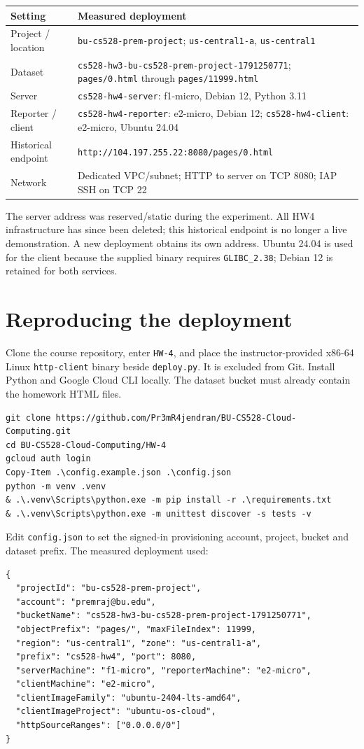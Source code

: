 \documentclass[11pt,letterpaper]{article}
\newcommand{\code}[1]{\texttt{\small #1}}
\newcommand{\bucket}{\nolinkurl{cs528-hw3-bu-cs528-prem-project-1791250771}}
\newcommand{\newreportpage}[1]{\clearpage\section{#1}}
\begin{document}
\begin{tabularx}{\linewidth}{@{}lY@{}}\toprule
Setting & Measured deployment \\ \midrule
Project / location & \code{bu-cs528-prem-project}; \code{us-central1-a}, \code{us-central1} \\
Dataset & \bucket; \code{pages/0.html} through \code{pages/11999.html} \\
Server & \code{cs528-hw4-server}: f1-micro, Debian 12, Python 3.11 \\
Reporter / client & \code{cs528-hw4-reporter}: e2-micro, Debian 12; \code{cs528-hw4-client}: e2-micro, Ubuntu 24.04 \\
Historical endpoint & \nolinkurl{http://104.197.255.22:8080/pages/0.html} \\
Network & Dedicated VPC/subnet; HTTP to server on TCP 8080; IAP SSH on TCP 22 \\
\bottomrule\end{tabularx}

The server address was reserved/static during the experiment. All HW4 infrastructure has
since been deleted; this historical endpoint is no longer a live demonstration. A new
deployment obtains its own address. Ubuntu 24.04 is used for the client because the supplied
binary requires \code{GLIBC\_2.38}; Debian 12 is retained for both services.

\newreportpage{Reproducing the deployment}
\label{sec:reproduce}
Clone the course repository, enter \code{HW-4}, and place the instructor-provided x86-64 Linux
\code{http-client} binary beside \code{deploy.py}. It is excluded from Git. Install Python and
Google Cloud CLI locally. The dataset bucket must already contain the homework HTML files.

\begin{lstlisting}
git clone https://github.com/Pr3mR4jendran/BU-CS528-Cloud-Computing.git
cd BU-CS528-Cloud-Computing/HW-4
gcloud auth login
Copy-Item .\config.example.json .\config.json
python -m venv .venv
& .\.venv\Scripts\python.exe -m pip install -r .\requirements.txt
& .\.venv\Scripts\python.exe -m unittest discover -s tests -v
\end{lstlisting}
Edit \code{config.json} to set the signed-in provisioning account, project, bucket and
dataset prefix. The measured deployment used:
\begin{lstlisting}
{
  "projectId": "bu-cs528-prem-project",
  "account": "premraj@bu.edu",
  "bucketName": "cs528-hw3-bu-cs528-prem-project-1791250771",
  "objectPrefix": "pages/", "maxFileIndex": 11999,
  "region": "us-central1", "zone": "us-central1-a",
  "prefix": "cs528-hw4", "port": 8080,
  "serverMachine": "f1-micro", "reporterMachine": "e2-micro",
  "clientMachine": "e2-micro",
  "clientImageFamily": "ubuntu-2404-lts-amd64",
  "clientImageProject": "ubuntu-os-cloud",
  "httpSourceRanges": ["0.0.0.0/0"]
}
\end{lstlisting}
\end{document}
